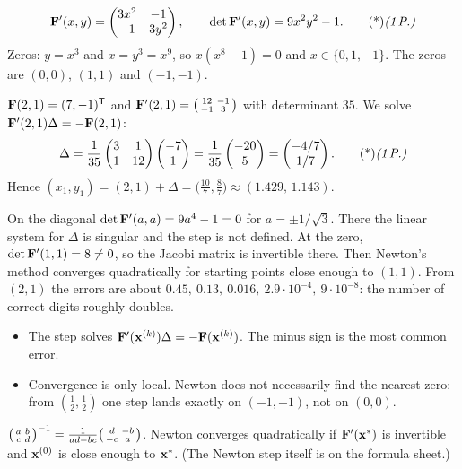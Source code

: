 \begin{solution}
\[
\vb F'(x,y)=\begin{pmatrix}3x^2&-1\\-1&3y^2\end{pmatrix},\qquad \det\vb F'(x,y)=9x^2y^2-1.\ptd{1}
\]
Zeros: $y=x^3$ and $x=y^3=x^9$, so $x(x^8-1)=0$ and $x\in\{0,1,-1\}$. The zeros are $(0,0)$, $(1,1)$ and $(-1,-1)$. 

 $\mathbf{F}(2,1)=(7,-1)^{\mathsf{T}}$ and $\mathbf{F}'(2,1)=\begin{psmallmatrix}12&-1\\-1&3\end{psmallmatrix}$ with determinant $35$. 
We solve $\mathbf{F}'(2,1)\Delta=-\mathbf{F}(2,1)$:
\[
\Delta=\frac1{35}\begin{pmatrix}3&1\\1&12\end{pmatrix}\begin{pmatrix}-7\\1\end{pmatrix}=\frac1{35}\begin{pmatrix}-20\\5\end{pmatrix}=\begin{pmatrix}-4/7\\1/7\end{pmatrix}.\ptd{1}
\]
Hence $(x_1,y_1)=(2,1)+\Delta=\big(\tfrac{10}7,\tfrac87\big)\approx(1.429,\,1.143)$. 

 On the diagonal $\det\mathbf{F}'(a,a)=9a^4-1=0$ for $a=\pm1/\sqrt3$. There the linear system for $\Delta$ is singular and the step is not defined. 
At the zero, $\det\mathbf{F}'(1,1)=8\neq0$, so the Jacobi matrix is invertible there. Then Newton's method converges quadratically for starting points close enough to $(1,1)$. From $(2,1)$ the errors are about $0.45,\ 0.13,\ 0.016,\ 2.9\cdot10^{-4},\ 9\cdot10^{-8}$: the number of correct digits roughly doubles. 

\begin{trap}
\begin{itemize}
\item The step solves $\mathbf{F}'(\mathbf{x}^{(k)})\Delta=-\mathbf{F}(\mathbf{x}^{(k)})$. The minus sign is the most common error.
\item Convergence is only local. Newton does not necessarily find the nearest zero: from $(\frac12,\frac12)$ one step lands exactly on $(-1,-1)$, not on $(0,0)$.
\end{itemize}
\end{trap}
\begin{heart}
$\begin{psmallmatrix}a&b\\c&d\end{psmallmatrix}^{-1}=\frac1{ad-bc}\begin{psmallmatrix}d&-b\\-c&a\end{psmallmatrix}$. Newton converges quadratically if $\mathbf{F}'(\mathbf{x}^*)$ is invertible and $\mathbf{x}^{(0)}$ is close enough to $\mathbf{x}^*$. (The Newton step itself is on the formula sheet.)
\end{heart}
\end{solution}

